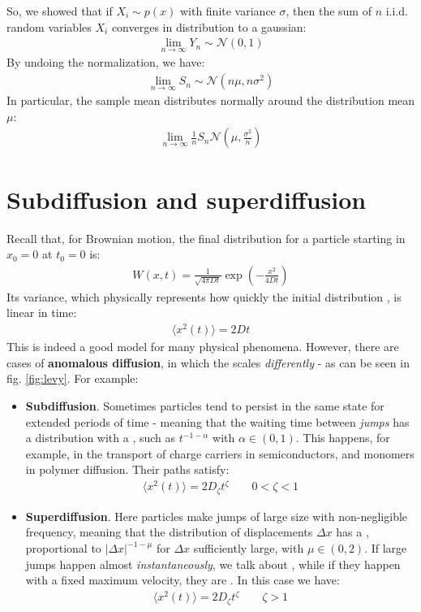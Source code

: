 \documentclass[../template.tex]{subfiles}
\begin{document}
\medskip

So, we showed that if $X_i \sim p(x)$ with finite variance $\sigma$, then the sum of $n$ i.i.d. random variables $X_i$ converges in distribution to a gaussian:
\begin{align*}
    \lim_{n \to \infty} Y_n \sim \mathcal{N}(0,1)
\end{align*}
By undoing the normalization, we have:
\begin{align*}
    \lim_{n \to \infty} S_n \sim \mathcal{N}(n \mu, n \sigma^2)
\end{align*}
In particular, the sample mean distributes normally around the distribution mean $\mu$:
\begin{align*}
    \lim_{n \to \infty}\frac{1}{n} S_n  \mathcal{N}\left(\mu, \frac{\sigma^2}{n} \right)
\end{align*}

\section{Subdiffusion and superdiffusion}
Recall that, for Brownian motion, the final distribution for a particle starting in $x_0 = 0$ at $t_0 = 0$ is:
\begin{align*}
    W(x,t) = \frac{1}{\sqrt{4 \pi D t}}\exp\left(-\frac{x^2}{4 D t} \right)
\end{align*}
Its variance, which physically represents how quickly the initial distribution , is linear in time:
\begin{align*}
    \langle x^2(t) \rangle = 2Dt
\end{align*}
This is indeed a good model for many physical phenomena. However, there are cases of \textbf{anomalous diffusion}, in which the  scales \textit{differently} - as can be seen in fig. \ref{fig:levy}. For example:
\begin{itemize}
    \item \textbf{Subdiffusion}. Sometimes particles tend to persist in the same state for extended periods of time - meaning that the waiting time between \textit{jumps} has a distribution with a , such as $t^{-1-\alpha}$ with $\alpha \in (0,1)$. This happens, for example, in the transport of charge carriers in semiconductors, and monomers in polymer diffusion. Their paths satisfy:
    \begin{align*}
        \langle x^2(t) \rangle = 2 D_{\zeta} t^{\zeta} \qquad 0 < \zeta < 1
    \end{align*}
    
    \item \textbf{Superdiffusion}. Here particles make jumps of large size with non-negligible frequency, meaning that the distribution of displacements $\Delta x$ has a , proportional to $|\Delta x|^{-1 - \mu}$ for $\Delta x$ sufficiently large, with $\mu \in (0,2)$. If large jumps happen almost \textit{instantaneously}, we talk about , while if they happen with a fixed maximum velocity, they are . In this case we have:
    \begin{align*}
        \langle x^2(t) \rangle = 2 D_{\zeta} t^\zeta \qquad \zeta > 1
    \end{align*}
\end{itemize} 
\end{document}
